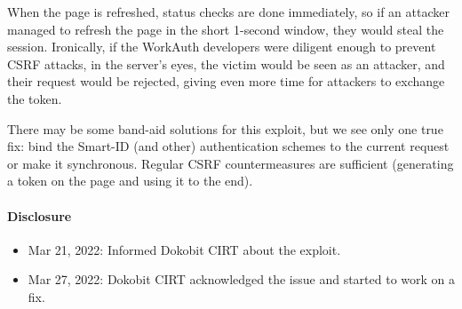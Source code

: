 When the page is refreshed, status checks are done immediately, so if an attacker managed to refresh the page in the short 1-second window, they would steal the session. Ironically, if the WorkAuth developers were diligent enough to prevent CSRF attacks, in the server's eyes, the victim would be seen as an attacker, and their request would be rejected, giving even more time for attackers to exchange the token.

There may be some band-aid solutions for this exploit, but we see only one true fix: bind the Smart-ID (and other) authentication schemes to the current request or make it synchronous. Regular CSRF countermeasures are sufficient (generating a token on the page and using it to the end).

\paragraph{Disclosure}

\begin{itemize}
  \item Mar 21, 2022: Informed Dokobit CIRT about the exploit.
  \item Mar 27, 2022: Dokobit CIRT acknowledged the issue and started to work on a fix.
\end{itemize}